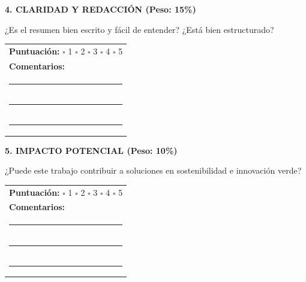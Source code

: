 \documentclass[12pt,a4paper]{article}
\begin{document}
\vspace{0.6cm}

\begin{tcolorbox}[enhanced, colback=verdeclaro, colframe=verdemid, boxrule=1.5pt, left=8pt, right=8pt, top=10pt, bottom=10pt]

\noindent\textbf{4. CLARIDAD Y REDACCIÓN (Peso: 15\%)}

¿Es el resumen bien escrito y fácil de entender? ¿Está bien estructurado?

\vspace{0.3cm}

\noindent
\begin{tabular}{p{14cm}}
\textbf{Puntuación:} \hspace{1cm}
$\square$ 1 \quad $\square$ 2 \quad $\square$ 3 \quad $\square$ 4 \quad $\square$ 5 \\[0.3cm]
\textbf{Comentarios:} \\
\rule{14cm}{0.4pt} \\
\rule{14cm}{0.4pt} \\
\rule{14cm}{0.4pt} \\
\end{tabular}

\end{tcolorbox}

\vspace{0.6cm}

\begin{tcolorbox}[enhanced, colback=verdeclaro, colframe=verdeosc, boxrule=1.5pt, left=8pt, right=8pt, top=10pt, bottom=10pt]

\noindent\textbf{5. IMPACTO POTENCIAL (Peso: 10\%)}

¿Puede este trabajo contribuir a soluciones en sostenibilidad e innovación verde?

\vspace{0.3cm}

\noindent
\begin{tabular}{p{14cm}}
\textbf{Puntuación:} \hspace{1cm}
$\square$ 1 \quad $\square$ 2 \quad $\square$ 3 \quad $\square$ 4 \quad $\square$ 5 \\[0.3cm]
\textbf{Comentarios:} \\
\rule{14cm}{0.4pt} \\
\rule{14cm}{0.4pt} \\
\rule{14cm}{0.4pt} \\
\end{tabular}

\end{tcolorbox}
\end{document}
